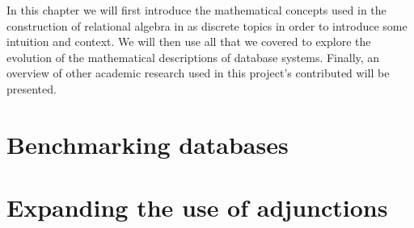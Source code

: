 In this chapter we will first introduce the mathematical concepts used in the construction of relational algebra in \cite{RelationalAlgebraByWayOfAdjunctions} as discrete topics in order to introduce some intuition and context. We will then use all that we covered to explore the evolution of the mathematical descriptions of database systems. Finally, an overview of other academic research used in this project's contributed will be presented.





\section{Benchmarking databases}
\section{Expanding the use of adjunctions}